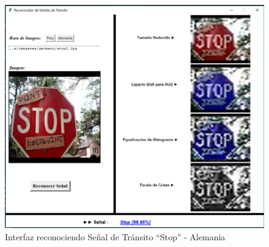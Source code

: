 		
		\begin{figure}[H]
			\includegraphics[width=1\textwidth, height=\textheight,keepaspectratio]{images/interfazWithGermSign} 
			\begin{center}
			\caption{\small{Interfaz reconociendo Señal de Tránsito “Stop” - Alemania}}
			\vspace{-1em}
			{\small{\fontsize{10}{16.8}\selectfont {Fuente propia}}}
			\end{center}
			\vspace{-1.5em}
		\end{figure}

